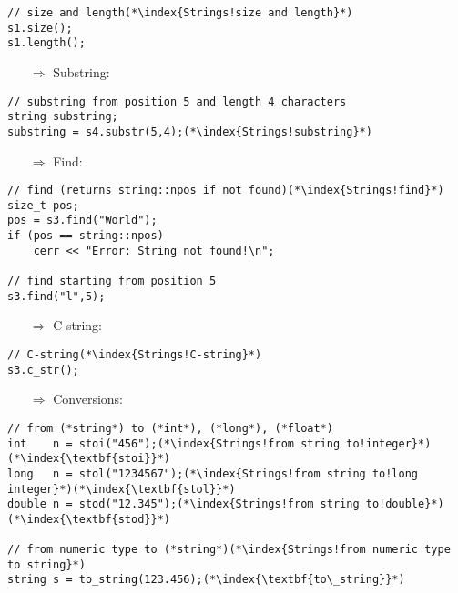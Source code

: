 \documentclass[10pt]{article}
\begin{document}
\begin{lstlisting}
// size and length(*\index{Strings!size and length}*)
s1.size();
s1.length();
\end{lstlisting}
\begin{enumerate}
\item[$\Rightarrow$] Substring:
\end{enumerate}
\begin{lstlisting}
// substring from position 5 and length 4 characters
string substring;
substring = s4.substr(5,4);(*\index{Strings!substring}*)
\end{lstlisting}
\begin{enumerate}
\item[$\Rightarrow$] Find:
\end{enumerate}
\begin{lstlisting}
// find (returns string::npos if not found)(*\index{Strings!find}*)
size_t pos;
pos = s3.find("World");
if (pos == string::npos)
    cerr << "Error: String not found!\n";

// find starting from position 5
s3.find("l",5);
\end{lstlisting}
\begin{enumerate}
\item[$\Rightarrow$] C-string:
\end{enumerate}
\begin{lstlisting}
// C-string(*\index{Strings!C-string}*)
s3.c_str();
\end{lstlisting}
\begin{enumerate}
\item[$\Rightarrow$] Conversions:
\end{enumerate}
\begin{lstlisting}
// from (*string*) to (*int*), (*long*), (*float*)
int    n = stoi("456");(*\index{Strings!from string to!integer}*)(*\index{\textbf{stoi}}*)
long   n = stol("1234567");(*\index{Strings!from string to!long integer}*)(*\index{\textbf{stol}}*)
double n = stod("12.345");(*\index{Strings!from string to!double}*)(*\index{\textbf{stod}}*)

// from numeric type to (*string*)(*\index{Strings!from numeric type to string}*)
string s = to_string(123.456);(*\index{\textbf{to\_string}}*)
\end{lstlisting}
%
%
\end{document}
